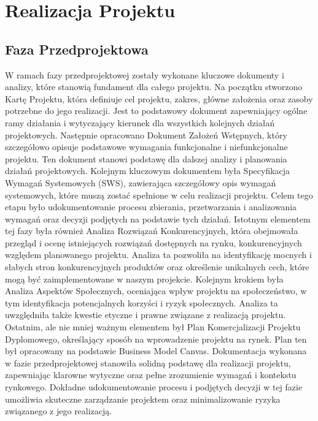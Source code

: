 
\chapter{Realizacja Projektu}
\label{ch:realizacja}


\section{Faza Przedprojektowa}
\label{sec:faza-przedprojektowa}

W ramach fazy przedprojektowej zostały wykonane kluczowe dokumenty i analizy, które stanowią fundament dla całego projektu.\newline
\indent Na początku stworzono Kartę Projektu, która definiuje cel projektu, zakres, główne założenia oraz zasoby potrzebne do jego realizacji. 
Jest to podstawowy dokument zapewniający ogólne ramy działania i wytyczający kierunek dla wszystkich kolejnych działań projektowych.
\indent Następnie opracowano Dokument Założeń Wstępnych, który szczegółowo opisuje podstawowe wymagania funkcjonalne i niefunkcjonalne projektu. 
Ten dokument stanowi podstawę dla dalszej analizy i planowania działań projektowych. \newline
\indent Kolejnym kluczowym dokumentem była Specyfikacja Wymagań Systemowych (SWS), 
zawierająca szczegółowy opis wymagań systemowych, które muszą zostać spełnione w celu realizacji projektu. 
Celem tego etapu było udokumentowanie procesu zbierania, przetwarzania i analizowania wymagań oraz decyzji podjętych na podstawie tych działań.\newline
\indent Istotnym elementem tej fazy była również Analiza Rozwiązań Konkurencyjnych, która obejmowała 
przegląd i ocenę istniejących rozwiązań dostępnych na rynku, konkurencyjnych względem planowanego projektu.
\indent Analiza ta pozwoliła na identyfikację mocnych i słabych stron konkurencyjnych produktów oraz określenie unikalnych cech, które mogą 
być zaimplementowane w naszym projekcie.\newline
\indent Kolejnym krokiem była Analiza Aspektów Społecznych, oceniająca wpływ projektu na społeczeństwo, w tym 
identyfikacja potencjalnych korzyści i ryzyk społecznych. Analiza ta uwzględniła także kwestie etyczne i prawne związane z realizacją projektu.
\indent Ostatnim, ale nie mniej ważnym elementem był Plan Komercjalizacji Projektu Dyplomowego, określający
 sposób na wprowadzenie projektu na rynek. Plan ten był opracowany na podstawie Business Model Canvas.\newline
Dokumentacja wykonana w fazie przedprojektowej stanowiła solidną podstawę dla realizacji projektu, 
zapewniając klarowne wytyczne oraz pełne zrozumienie wymagań i kontekstu rynkowego. Dokładne udokumentowanie procesu i 
podjętych decyzji w tej fazie umożliwia skuteczne zarządzanie projektem oraz minimalizowanie ryzyka związanego z jego realizacją.

